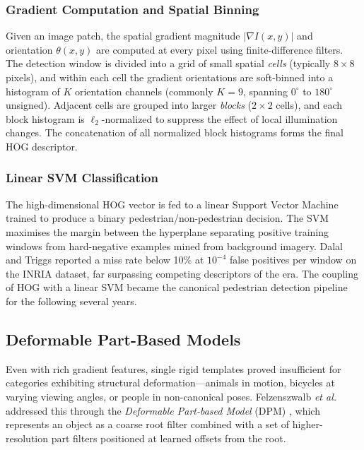 \documentclass[conference]{IEEEtran}
\begin{document}
\subsubsection*{Gradient Computation and Spatial Binning}

Given an image patch, the spatial gradient magnitude
$|\nabla I(x,y)|$ and orientation $\theta(x,y)$ are computed at
every pixel using finite-difference filters.
The detection window is divided into a grid of small spatial
\emph{cells} (typically $8 \times 8$ pixels), and within each
cell the gradient orientations are soft-binned into a histogram
of $K$ orientation channels (commonly $K=9$, spanning $0^\circ$
to $180^\circ$ unsigned).
Adjacent cells are grouped into larger \emph{blocks}
($2 \times 2$ cells), and each block histogram is
$\ell_2$-normalized to suppress the effect of local illumination
changes.
The concatenation of all normalized block histograms forms the
final HOG descriptor.

\subsubsection*{Linear SVM Classification}

The high-dimensional HOG vector is fed to a linear Support Vector
Machine trained to produce a binary pedestrian/non-pedestrian
decision.
The SVM maximises the margin between the hyperplane separating
positive training windows from hard-negative examples mined from
background imagery.
Dalal and Triggs reported a miss rate below 10\% at $10^{-4}$
false positives per window on the INRIA dataset, far surpassing
competing descriptors of the era.
The coupling of HOG with a linear SVM became the canonical
pedestrian detection pipeline for the following several years.

\subsection{Deformable Part-Based Models}
\label{subsec:dpm}

Even with rich gradient features, single rigid templates
proved insufficient for categories exhibiting structural
deformation---animals in motion, bicycles at varying viewing
angles, or people in non-canonical poses.
Felzenszwalb \emph{et al.} addressed this through the
\emph{Deformable Part-based Model} (DPM)
\cite{felzenszwalb2010object,felzenszwalb2008discriminatively},
which represents an object as a coarse root filter combined with
a set of higher-resolution part filters positioned at learned
offsets from the root.
\end{document}
